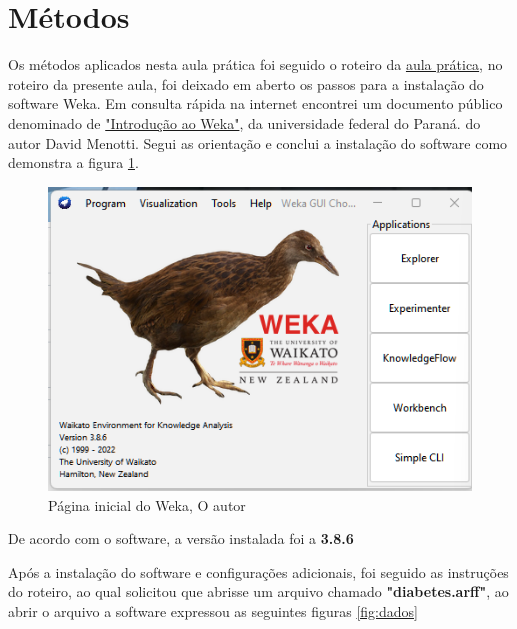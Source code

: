 \section{Métodos}
\par Os métodos aplicados nesta aula prática foi seguido o roteiro da \href{https://github.com/OgliariNatan/neuralPerceptron/blob/main/Aula%20pr%C3%A1tica.pdf}{aula prática}, no roteiro da presente aula, foi deixado em aberto os passos para a instalação do software Weka. Em consulta rápida na internet encontrei um documento público denominado de \href{https://github.com/OgliariNatan/neuralPerceptron/blob/main/ML-09weka.pdf}{"Introdução ao Weka"}, da universidade federal do Paraná. do autor David Menotti. Segui as orientação e conclui a instalação do software como demonstra a figura \ref{fig:home_weka}.
\begin{figure}[h]
  \center
  \includegraphics[scale=0.5]{figure/home_weka.png}
  \caption{Página inicial do Weka, O autor}\label{fig:home_weka}
\end{figure}
\par De acordo com o software, a versão instalada foi a \textbf{3.8.6}

\par Após a instalação do software e configurações adicionais, foi seguido as instruções do roteiro, ao qual solicitou que abrisse um arquivo chamado \textbf{"diabetes.arff"}, ao abrir o arquivo a software expressou as seguintes figuras \ref{fig:dados}

